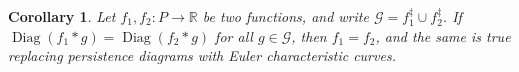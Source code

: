 \documentclass[conference]{IEEEtran}
\newtheorem{corollary}[theorem]{Corollary}
\theoremstyle{definition}
\numberwithin{figure}{section}
\begin{document}
\begin{corollary}
	Let $f_1, f_2 : P \to \mathbb{R}$ be two functions, and write $\mathcal{G} = f_{1}^{\ddagger} \cup f_{2}^{\ddagger}$. If $\operatorname{Diag}(f_1 \ast g) = \operatorname{Diag}(f_2 \ast g)$ for all $g \in \mathcal{G}$, then $f_1 = f_2$, and the same is true replacing persistence diagrams with Euler characteristic curves.
\end{corollary}

\newpage





 
\end{document}
